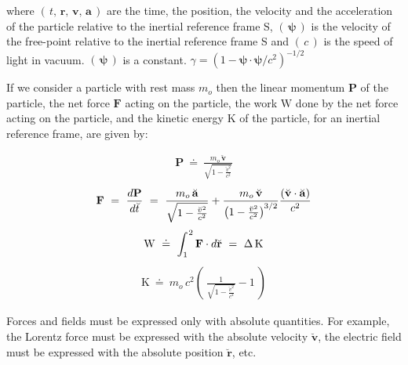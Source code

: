 \documentclass[10pt,fleqn]{article}
\begin{document}
\par \vspace{+1.20em}
\noindent where $( \, t, \, \mathbf{r}, \, \mathbf{v}, \, \mathbf{a} \, )$ are the time, the position, the velocity and the acceleration of the particle relative to the inertial reference frame S, $( \, \boldsymbol{\psi} \, )$ is the velocity of the free-point relative to the inertial reference frame S and $( \, c \, )$ is the speed of light in vacuum. $( \, \boldsymbol{\psi} \, )$ is a constant. {\small $\gamma = ({1 - \boldsymbol{\psi} \cdot \boldsymbol{\psi}/c^2})^{-1/2}$}

\newpage

\par {}

\bigskip \smallskip

\noindent If we consider a particle with rest mass $m_o$ then the linear momentum $\mathbf{P}$ of the particle, the net force $\mathbf{F}$ acting on the particle, the work $\mathrm{W}$ done by the net force acting on the particle, and the kinetic energy $\mathrm{K}$ of the particle, for an inertial reference frame, are given by:
\par \vspace{-0.30em}
\begin{eqnarray*}
\mathbf{P} ~\doteq~ \frac{m_o \, \breve{\mathbf{v}}}{\sqrt{1 - \frac{\breve{v}^2}{c^2}}}
\end{eqnarray*}
\vspace{-0.30em}
\begin{eqnarray*}
\mathbf{F} ~=~ \frac{d\mathbf{P}}{d\breve{t}} ~=~ \frac{m_o \, \breve{\mathbf{a}}}{\sqrt{1 - \frac{\breve{v}^2}{c^2}}} + \frac{m_o \, \breve{\mathbf{v}}}{\left(1 - \frac{\breve{v}^2}{c^2}\right)^{\hspace{-0.03em}{3/2}}} \frac{(\breve{\mathbf{v}} \cdot \breve{\mathbf{a}})}{c^2}
\end{eqnarray*}
\vspace{-0.30em}
\begin{eqnarray*}
\mathrm{W} ~\doteq~ \int_1^{\hspace{+0.06em}2} \mathbf{F} \cdot d\breve{\mathbf{r}} ~=~ \Delta \, \mathrm{K}
\end{eqnarray*}
\vspace{-0.30em}
\begin{eqnarray*}
\mathrm{K} ~\doteq~ m_o \, c^2 \left ( \: \frac{1}{\sqrt{1 - \frac{\breve{v}^2}{c^2}}} - 1 \: \right )
\end{eqnarray*}
\par \vspace{+1.20em}
\noindent Forces and fields must be expressed only with absolute quantities. For example, the Lorentz force must be expressed with the absolute velocity $\breve{\mathbf{v}}$, the electric field must be expressed with the absolute position $\breve{\mathbf{r}}$, etc.
\end{document}
